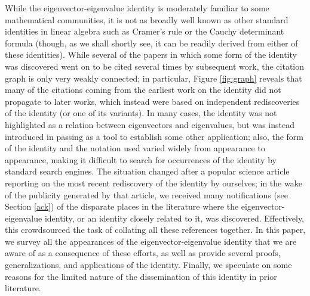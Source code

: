 \documentclass{amsart}
\begin{document}
While the eigenvector-eigenvalue identity is moderately familiar to some mathematical communities, it is not as broadly well known as other standard identities in linear algebra such as Cramer's rule \cite{cramer} or the Cauchy determinant formula \cite{cauchy} (though, as we shall shortly see, it can be readily derived from either of these identities).  While several of the papers in which some form of the identity was discovered went on to be cited several times by subsequent work, the citation graph is only very weakly connected; in particular, Figure \ref{fig:graph} reveals that many of the citations coming from the earliest work on the identity did not propagate to later works, which instead were based on independent rediscoveries of the identity (or one of its variants).  In many cases, the identity was not highlighted as a relation between eigenvectors and eigenvalues, but was instead introduced in passing as a tool to establish some other application; also, the form of the identity and the notation used varied widely from appearance to appearance, making it difficult to search for occurrences of the identity by standard search engines.  The situation changed after a popular science article \cite{wolchover-2019} reporting on the most recent rediscovery \cite{Denton:2019ovn, DPTZ} of the identity by ourselves; in the wake of the publicity generated by that article, we received many notifications (see Section \ref{ack}) of the disparate places in the literature where the eigenvector-eigenvalue identity, or an identity closely related to it, was discovered.  Effectively, this crowdsourced the task of collating all these references together.  In this paper, we survey all the appearances of the eigenvector-eigenvalue identity that we are aware of as a consequence of these efforts, as well as provide several proofs, generalizations, and applications of the identity.  Finally, we speculate on some reasons for the limited nature of the dissemination of this identity in prior literature. 
\end{document}
